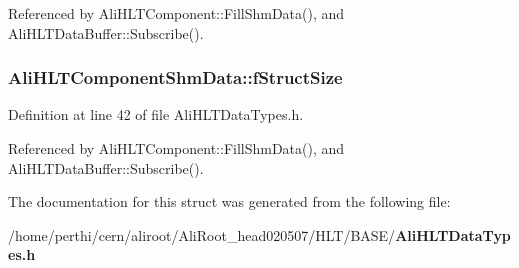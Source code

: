 Referenced by Ali\-HLTComponent::Fill\-Shm\-Data(), and Ali\-HLTData\-Buffer::Subscribe().
\subsubsection{ {\bf Ali\-HLTComponent\-Shm\-Data::f\-Struct\-Size}}\label{structAliHLTComponentShmData_o0}




Definition at line 42 of file Ali\-HLTData\-Types.h.

Referenced by Ali\-HLTComponent::Fill\-Shm\-Data(), and Ali\-HLTData\-Buffer::Subscribe().

The documentation for this struct was generated from the following file:\begin{CompactItemize}
\item 
/home/perthi/cern/aliroot/Ali\-Root\_\-head020507/HLT/BASE/{\bf Ali\-HLTData\-Types.h}\end{CompactItemize}
